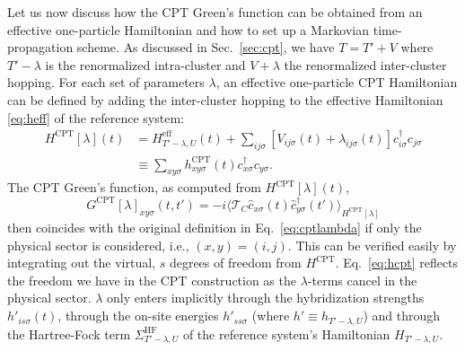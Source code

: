 \documentclass[twocolumn,prb,showpacs,aps,superscriptaddress]{revtex4}
\newcommand{\cds}[1]{\ensuremath{c^\dagger_{#1}}}
\newcommand{\ccs}[1]{\ensuremath{c_{#1}}}
\newcommand{\cd}[1]{\ensuremath{\hat{c}^\dagger_{#1}}}
\newcommand{\cc}[1]{\ensuremath{\hat{c}_{#1}}}
\newcommand{\est}[1]{\ensuremath{\langle {#1} \rangle}}
\newcommand{\tcorder}[0]{\ensuremath{\mathcal{T}_C}}
\begin{document}
Let us now discuss how the CPT Green's function can be obtained from an
effective one-particle Hamiltonian and how to set up a Markovian
time-propagation scheme. \cite{GP15} As discussed in Sec.\ \ref{sec:cpt}, we
have $T=T'+V$ where $T' - \lambda$ is the renormalized intra-cluster and $V +
\lambda$ the renormalized inter-cluster hopping.  For each set of parameters
$\lambda$, an effective one-particle CPT Hamiltonian can be defined by adding
the inter-cluster hopping to the effective Hamiltonian \eqref{eq:heff} of the
reference system:
\begin{align}
  \label{eq:hcpt}
  H^\text{CPT}[\lambda](t) 
  &=
  H^\mathrm{eff}_{T' - \lambda, U}(t)
  + 
  \sum_{ij\sigma} [V_{ij\sigma}(t) + \lambda_{ij\sigma}(t)]
  \cds{i\sigma}\ccs{j\sigma}\nonumber\\
  &\equiv 
  \sum_{xy\sigma} h^\text{CPT}_{xy\sigma}(t) \cds{x\sigma}\ccs{y\sigma}.
\end{align}
The CPT Green's function, as computed from $H^\text{CPT}[\lambda](t)$, 
\begin{equation}
  \label{eq:gcpt}
  G^\text{CPT}[\lambda]_{xy\sigma}(t,t')
  =
  -i\est{
  \tcorder
  \cc{x\sigma}(t)\cd{y\sigma}(t')
  }_{H^\text{CPT}[\lambda]}
\end{equation}
then coincides with the original definition in Eq.\ \eqref{eq:cptlambda} if
only the physical sector is considered, i.e., $(x,y)=(i,j)$. This can be
verified easily by integrating out the virtual, $s$ degrees of freedom from
$H^\mathrm{CPT}$. Eq.\ \eqref{eq:hcpt} reflects the freedom we have in the CPT
construction as the $\lambda$-terms cancel in the physical sector.  $\lambda$
only enters implicitly through the hybridization strengths $h'_{is\sigma}(t)$,
through the on-site energies $h'_{ss\sigma}$ (where $h' \equiv h_{T' - \lambda,
U}$) and through the Hartree-Fock term $\Sigma_{T'-\lambda, U}^\mathrm{HF}$ of
the reference system's Hamiltonian $H_{T' - \lambda, U}$.
\end{document}
